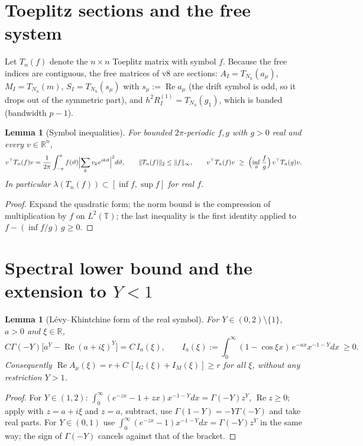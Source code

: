\documentclass[11pt]{amsart}
\newtheorem{lemma}[theorem]{Lemma}
\theoremstyle{remark}
\newcommand{\R}{\mathbb R}
\newcommand{\norm}[1]{\lVert #1\rVert}
\DeclareMathOperator{\Real}{Re}
\newcommand{\T}{T}
\begin{document}
\section{Toeplitz sections and the free system}

Let $\T_n(f)$ denote the $n\times n$ Toeplitz matrix with symbol $f$.  Because
the free indices are contiguous, the free matrices of v8 are sections:
$A_I=\T_{N_h}(a_\mu)$, $M_I=\T_{N_h}(m)$, $S_I=\T_{N_h}(s_\mu)$ with
$s_\mu:=\Real a_\mu$ (the drift symbol is odd, so it drops out of the
symmetric part), and $h^2R^{(1)}_I=\T_{N_h}(g_1)$, which is banded
(bandwidth $p-1$).

\begin{lemma}[Symbol inequalities]\label{lem:toeplitz}
For bounded $2\pi$-periodic $f,g$ with $g>0$ real and every $v\in\R^n$,
\[
 v^\top\T_n(f)v=\frac1{2\pi}\int_{-\pi}^{\pi}f(\vartheta)\Bigl|\sum_kv_ke^{ik\vartheta}\Bigr|^2d\vartheta,
 \qquad
 \norm{\T_n(f)}_2\le\norm f_\infty,
 \qquad
 v^\top\T_n(f)v\ \ge\ \Bigl(\inf_\vartheta\frac{f}{g}\Bigr)\,v^\top\T_n(g)v .
\]
In particular $\lambda(\T_n(f))\subset[\inf f,\sup f]$ for real $f$.
\end{lemma}
\begin{proof}
Expand the quadratic form; the norm bound is the compression of
multiplication by $f$ on $L^2(\mathbb T)$; the last inequality is the first
identity applied to $f-(\inf f/g)\,g\ge0$.
\end{proof}

\section{Spectral lower bound and the extension to $Y<1$}

\begin{lemma}[L\'evy--Khintchine form of the real symbol]\label{lem:LK}
For $Y\in(0,2)\setminus\{1\}$, $a>0$ and $\xi\in\R$,
\[
 C\Gamma(-Y)\bigl[a^Y-\Real(a+i\xi)^Y\bigr]
 =C\,I_a(\xi),\qquad
 I_a(\xi):=\int_0^\infty(1-\cos\xi x)\,e^{-ax}x^{-1-Y}dx\ \ge0 .
\]
Consequently $\Real A_\mu(\xi)=r+C\,[I_G(\xi)+I_M(\xi)]\ge r$ for all $\xi$,
without any restriction $Y>1$.
\end{lemma}
\begin{proof}
For $Y\in(1,2)$: $\int_0^\infty(e^{-zx}-1+zx)x^{-1-Y}dx=\Gamma(-Y)z^Y$,
$\Real z\ge0$; apply with $z=a+i\xi$ and $z=a$, subtract, use
$\Gamma(1-Y)=-Y\Gamma(-Y)$ and take real parts.  For $Y\in(0,1)$ use
$\int_0^\infty(e^{-zx}-1)x^{-1-Y}dx=\Gamma(-Y)z^Y$ in the same way; the
sign of $\Gamma(-Y)$ cancels against that of the bracket.
\end{proof}
\end{document}
